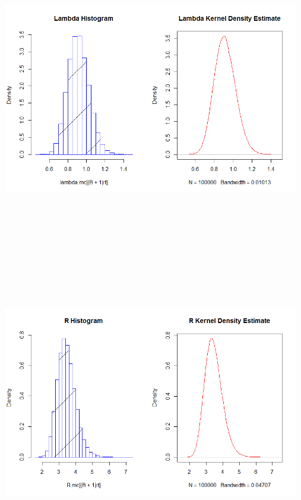 \documentclass[10pt,a4paper]{article}
\begin{document}
\centerline{\includegraphics[width=13cm,height=13cm,keepaspectratio]{./images/22}}\centerline{\includegraphics[width=13cm,height=13cm,keepaspectratio]{./images/23}}
\end{document}
